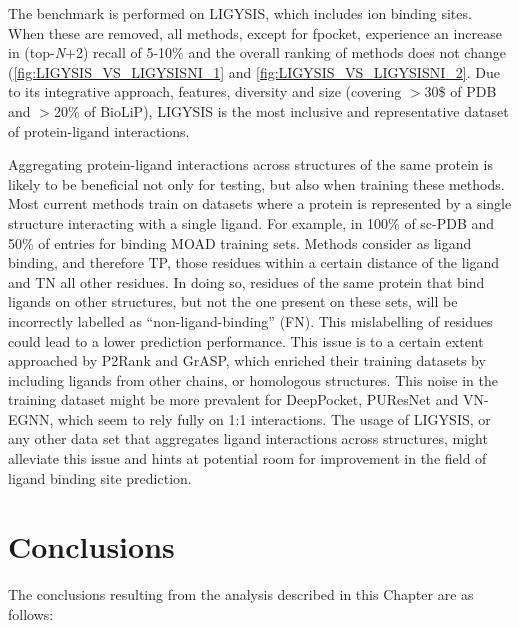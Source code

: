 The benchmark is performed on LIGYSIS, which includes ion binding sites. When these are removed, all methods, except for fpocket, experience an increase in (top-\textit{N}+2) recall of 5-10\% and the overall ranking of methods does not change (\autoref{fig:LIGYSIS_VS_LIGYSISNI_1} and \autoref{fig:LIGYSIS_VS_LIGYSISNI_2}. Due to its integrative approach, features, diversity and size (covering $>$30\$ of PDB and $>$20\% of BioLiP), LIGYSIS is the most inclusive and representative dataset of protein-ligand interactions.

Aggregating protein-ligand interactions across structures of the same protein is likely to be beneficial not only for testing, but also when training these methods. Most current methods train on datasets where a protein is represented by a single structure interacting with a single ligand. For example, in 100\% of sc-PDB and 50\% of entries for binding MOAD training sets. Methods consider as ligand binding, and therefore TP, those residues within a certain distance of the ligand and TN all other residues. In doing so, residues of the same protein that bind ligands on other structures, but not the one present on these sets, will be incorrectly labelled as ``non-ligand-binding'' (FN). This mislabelling of residues could lead to a lower prediction performance. This issue is to a certain extent approached by P2Rank and GrASP, which enriched their training datasets by including ligands from other chains, or homologous structures. This noise in the training dataset might be more prevalent for DeepPocket, PUResNet and VN-EGNN, which seem to rely fully on 1:1 interactions. The usage of LIGYSIS, or any other data set that aggregates ligand interactions across structures, might alleviate this issue and hints at potential room for improvement in the field of ligand binding site prediction.

\section{Conclusions}

The conclusions resulting from the analysis described in this Chapter are as follows:

